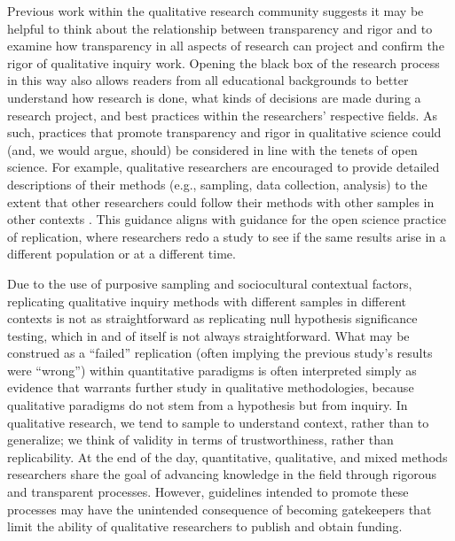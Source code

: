 \documentclass[authordate, meta, issue]{jote-new-article}
\begin{document}
Previous work within the qualitative research community suggests it may be helpful to think about the relationship between transparency and rigor \parencites[e.g.,][]{Billups2014}{Davies2002}{Mill2003}{Rolfe2006} and to examine how transparency in all aspects of research can project and confirm the rigor of qualitative inquiry work. Opening the black box of the research process in this way also allows readers from all educational backgrounds to better understand how research is done, what kinds of decisions are made during a research project, and best practices within the researchers’ respective fields. As such, practices that promote transparency and rigor in qualitative science could (and, we would argue, should) be considered in line with the tenets of open science. For example, qualitative researchers are encouraged to provide detailed descriptions of their methods (e.g., sampling, data collection, analysis) to the extent that other researchers could follow their methods with other samples in other contexts \parencites{Creswell2018}. This guidance aligns with guidance for the open science practice of replication, where researchers redo a study to see if the same results arise in a different population or at a different time.



Due to the use of purposive sampling and sociocultural contextual factors, replicating qualitative inquiry methods with different samples in different contexts is not as straightforward as replicating null hypothesis significance testing, which in and of itself is not always straightforward. What may be construed as a “failed” replication (often implying the previous study’s results were “wrong”) within quantitative paradigms is often interpreted simply as evidence that warrants further study in qualitative methodologies, because qualitative paradigms do not stem from a hypothesis but from inquiry. In qualitative research, we tend to sample to understand context, rather than to generalize; we think of validity in terms of trustworthiness, rather than replicability. At the end of the day, quantitative, qualitative, and mixed methods researchers share the goal of advancing knowledge in the field through rigorous and transparent processes. However, guidelines intended to promote these processes may have the unintended consequence of becoming gatekeepers that limit the ability of qualitative researchers to publish and obtain funding.
\end{document}
